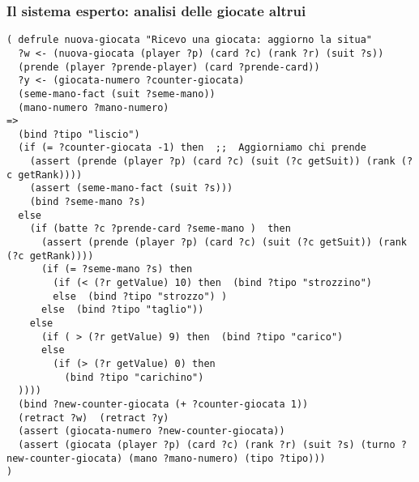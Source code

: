 \documentclass{beamer}
\begin{document}

\begin{frame}[fragile]
   \frametitle{Il sistema esperto: analisi delle giocate altrui}
   \begin{lstlisting}
( defrule nuova-giocata "Ricevo una giocata: aggiorno la situa"
  ?w <- (nuova-giocata (player ?p) (card ?c) (rank ?r) (suit ?s))
  (prende (player ?prende-player) (card ?prende-card))
  ?y <- (giocata-numero ?counter-giocata)
  (seme-mano-fact (suit ?seme-mano))
  (mano-numero ?mano-numero)
=>
  (bind ?tipo "liscio")
  (if (= ?counter-giocata -1) then  ;;  Aggiorniamo chi prende
    (assert (prende (player ?p) (card ?c) (suit (?c getSuit)) (rank (?c getRank))))
    (assert (seme-mano-fact (suit ?s)))
    (bind ?seme-mano ?s)
  else
    (if (batte ?c ?prende-card ?seme-mano )  then
      (assert (prende (player ?p) (card ?c) (suit (?c getSuit)) (rank (?c getRank))))
      (if (= ?seme-mano ?s) then
        (if (< (?r getValue) 10) then  (bind ?tipo "strozzino")
        else  (bind ?tipo "strozzo") )
      else  (bind ?tipo "taglio"))
    else
      (if ( > (?r getValue) 9) then  (bind ?tipo "carico")
      else
        (if (> (?r getValue) 0) then
          (bind ?tipo "carichino")
  ))))
  (bind ?new-counter-giocata (+ ?counter-giocata 1))
  (retract ?w)  (retract ?y)
  (assert (giocata-numero ?new-counter-giocata))
  (assert (giocata (player ?p) (card ?c) (rank ?r) (suit ?s) (turno ?new-counter-giocata) (mano ?mano-numero) (tipo ?tipo)))  
)
   \end{lstlisting}
   
\end{frame}



\end{document}
